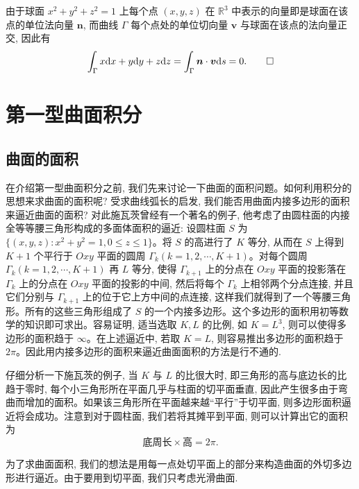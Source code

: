 \begin{solve}[{解法 2}]
由于球面 $x^2+y^2+z^2=1$ 上每个点 $(x,y,z)$ 在 $\mathbb R^3$ 中表示的向量即是球面在该点的单位法向量 $\boldsymbol n$, 而曲线 $\Gamma$ 每个点处的单位切向量 $\boldsymbol v$ 与球面在该点的法向量正交, 因此有
\[
  \int_\Gamma x\mathrm dx+y\mathrm dy+z\mathrm dz
  =\int_\Gamma \boldsymbol n\cdot\boldsymbol v\mathrm ds=0.
\qedhere
\]
\end{solve}


\section{第一型曲面积分}
\label{sec:ma-16-3}

\subsection{曲面的面积}
\label{subsec:ma-16-3-1}

在介绍第一型曲面积分之前, 我们先来讨论一下曲面的面积问题。如何利用积分的思想来求曲面的面积呢? 受求曲线弧长的启发, 我们能否用曲面内接多边形的面积来逼近曲面的面积? 对此施瓦茨曾经有一个著名的例子, 他考虑了由圆柱面的内接全等等腰三角形构成的多面体面积的逼近: 设圆柱面 $S$ 为 $\{(x,y,z):x^2+y^2=1,0\leqslant z\leqslant1\}$。将 $S$ 的高进行了 $K$ 等分, 从而在 $S$ 上得到 $K+1$ 个平行于 $Oxy$ 平面的圆周 $\Gamma_k(k=1,2,\cdots,K+1)$。对每个圆周 $\Gamma_k(k=1,2,\cdots,K+1)$ 再 $L$ 等分, 使得 $\Gamma_{k+1}$ 上的分点在 $Oxy$ 平面的投影落在 $\Gamma_k$ 上的分点在 $Oxy$ 平面的投影的中间, 然后将每个 $\Gamma_k$ 上相邻两个分点连接, 并且它们分别与 $\Gamma_{k+1}$ 上的位于它上方中间的点连接, 这样我们就得到了一个等腰三角形。所有的这些三角形组成了 $S$ 的一个内接多边形。这个多边形的面积用初等数学的知识即可求出。容易证明, 适当选取 $K,L$ 的比例, 如 $K=L^3$, 则可以使得多边形的面积趋于 $\infty$。在上述逼近中, 若取 $K=L$, 则容易推出多边形的面积趋于 $2\pi$。因此用内接多边形的面积来逼近曲面面积的方法是行不通的.

仔细分析一下施瓦茨的例子, 当 $K$ 与 $L$ 的比很大时, 即三角形的高与底边长的比趋于零时, 每个小三角形所在平面几乎与柱面的切平面垂直, 因此产生很多由于弯曲而增加的面积。如果该三角形所在平面越来越“平行”于切平面, 则多边形面积逼近将会成功。注意到对于圆柱面, 我们若将其摊平到平面, 则可以计算出它的面积为
\[
  \text{底周长}\times\text{高}=2\pi.
\]

为了求曲面面积, 我们的想法是用每一点处切平面上的部分来构造曲面的外切多边形进行逼近。由于要用到切平面, 我们只考虑光滑曲面.

